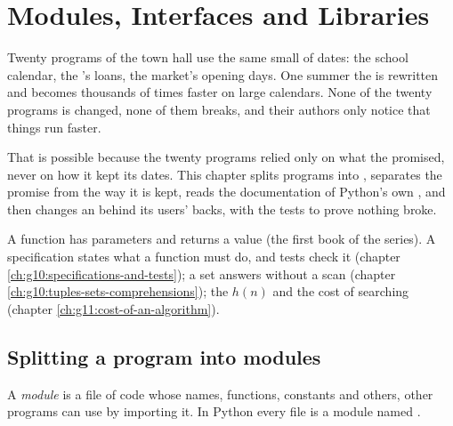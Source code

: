 \chapter{Modules, Interfaces and Libraries}\label{ch:g11:modules-and-interfaces}

Twenty programs of the town hall use the same small  of dates: the school calendar, the 's loans, the
market's opening days. One summer the  is rewritten and becomes thousands of times faster on large calendars.
None of the twenty programs is changed, none of them breaks, and their authors only notice that things run faster.

That is possible because the twenty programs relied only on what the  promised, never on how it kept its
dates. This chapter splits programs into , separates the promise from the way it is kept, reads the
documentation of Python's own , and then changes an  behind its users' backs, with the tests to
prove nothing broke.

\begin{recall}
A function has parameters and returns a value (the first book of the series). A specification states what a function
must do, and tests check it (chapter \ref{ch:g10:specifications-and-tests}); a set answers  without a
scan (chapter \ref{ch:g10:tuples-sets-comprehensions}); the  $h(n)$ and the cost of searching
(chapter \ref{ch:g11:cost-of-an-algorithm}).
\end{recall}

\section{Splitting a program into modules}\label{sec:g11:modules-and-interfaces:modules}

\begin{definition}[Module]\label{def:g11:modules-and-interfaces:module}
A \emph{module} is a file of code whose names, functions, constants and others, other programs can use by
importing it. In Python every file  is a module named .
\end{definition}


